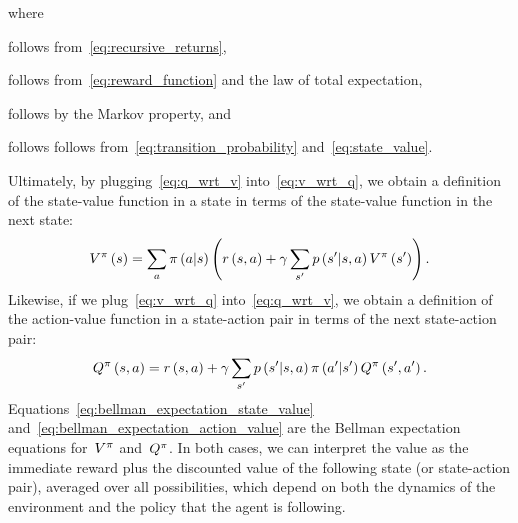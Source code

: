 where
\begin{enumerate*}[label=(\alph*)]
	\item follows from~\eqref{eq:recursive_returns},
	\item follows from~\eqref{eq:reward_function} and the law of total expectation,
	\item follows by the Markov property, and
	\item follows follows from~\eqref{eq:transition_probability} and~\eqref{eq:state_value}.
\end{enumerate*}
Ultimately, by plugging~\eqref{eq:q_wrt_v} into~\eqref{eq:v_wrt_q}, we obtain a definition of the state-value function in a state in terms of the state-value function in the next state:
\begin{equation} \label{eq:bellman_expectation_state_value}
    \statevalue\policyscript\left(\state\right)=\sum_{\action}\policy\left(\action\middle\vert\state\right)\left(\immediatereward\left(\state,\action\right)+\discount\sum_{\state'}\transition\left(\state'\middle\vert\state,\action\right)\statevalue\policyscript\left(\state'\right)\right).
\end{equation}
Likewise, if we plug~\eqref{eq:v_wrt_q} into~\eqref{eq:q_wrt_v}, we obtain a definition of the action-value function in a state-action pair in terms of the next state-action pair:
\begin{equation} \label{eq:bellman_expectation_action_value}
    \actionvalue\policyscript\left(\state,\action\right)=\immediatereward\left(\state,\action\right)+\discount\sum_{\state'}\transition\left(\state'\middle\vert\state,\action\right)\policy\left(\action'\middle\vert \state'\right)\actionvalue\policyscript\left(\state',\action'\right).
\end{equation}
Equations~\eqref{eq:bellman_expectation_state_value} and~\eqref{eq:bellman_expectation_action_value} are the Bellman expectation equations for~${V^{\pi}}$ and~${Q^{\pi}}$. In both cases, we can interpret the value as the immediate reward plus the discounted value of the following state (or state-action pair), averaged over all possibilities, which depend on both the dynamics of the environment and the policy that the agent is following.

